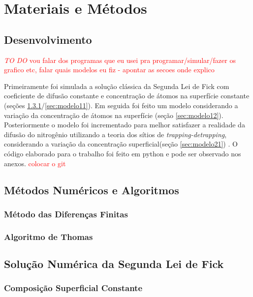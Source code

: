 \documentclass[]{politex}
\newcommand\myworries[1]{\textcolor{red}{#1}}
\begin{document}
\chapter{Materiais e Métodos}
\section{Desenvolvimento}
\myworries{\textit{TO DO}}
\myworries{vou falar dos programas que eu usei pra programar/simular/fazer os grafico etc, falar quais modelos eu fiz - apontar as secoes onde explico}

Primeiramente foi simulada a solução clássica da Segunda Lei de Fick com coeficiente de difusão constante e concentração de átomos na superfície constante (seções \ref{sec:sol-numerica-2alei}/\ref{sec:modelo11}). Em seguida foi feito um modelo considerando a variação da concentração de átomos na superfície (seção \ref{sec:modelo12}). Posteriormente o modelo foi incrementado para melhor satisfazer a realidade da difusão do nitrogênio utilizando a teoria dos sítios de \textit{trapping-detrapping}, considerando a variação da concentração superficial(seção \ref{sec:modelo21}) .
O código elaborado para o trabalho foi feito em python e pode ser observado nos anexos. \myworries{colocar o git}

\section{Métodos Numéricos e Algoritmos}

\subsection{Método das Diferenças Finitas}
\label{sec:dif-fin}


\subsection{Algoritmo de Thomas}	
\label{sec:algo-thomas}


\section{Solução Numérica da Segunda Lei de Fick}
\subsection{Composição Superficial Constante}
\label{sec:sol-numerica-2alei}

\end{document}
